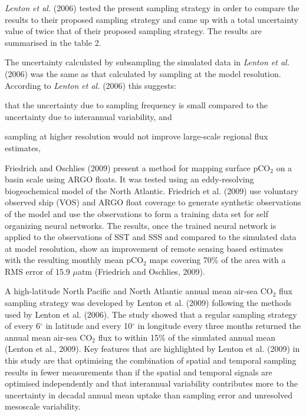 \documentclass[11pt, a4paper]{article}
\numberwithin{figure}{section}
\numberwithin{table}{section}
\begin{document}


\emph{Lenton et al.} (2006) tested the present sampling strategy in order to compare the 
results to their proposed sampling strategy and came up with a total uncertainty value of
twice that of their proposed sampling strategy. The results are summarised in the table 2.



The uncertainty calculated by subsampling the simulated data in \emph{Lenton et al.} (2006)
was the same as that calculated by sampling at the model resolution. According to
\emph{Lenton et al.} (2006) this suggests: 
\begin{inparaenum}[(1)]
\item that the uncertainty due to sampling frequency is small compared to 
the uncertainty due to interannual variability, and
\item sampling at higher resolution would not improve large-scale regional flux estimates,
\end{inparaenum}

Friedrich and Oschlies (2009) present a method for mapping surface pCO$_{2}$ 
on a basin scale using ARGO floats. It was tested using an eddy-resolving 
biogeochemical model of the North Atlantic. 
Friedrich et al. (2009) use voluntary observed ship (VOS) and ARGO float 
coverage to generate synthetic observations of the model and use the observations 
to form a training data set for self organizing neural networks.
The results, once the trained neural network is applied to the observations of 
SST and SSS and compared to the simulated data at model resolution, show an 
improvement of remote sensing based estimates with the resulting monthly mean 
pCO$_2$ maps covering 70\% of the area with a RMS error of 
15.9 $\mu$atm (Friedrich and Oschlies, 2009).

A high-latitude North Pacific and North Atlantic annual mean air-sea CO$_2$ 
flux sampling strategy was developed by Lenton et al. (2009) following the 
methods used by Lenton et al. (2006). 
The study showed that a regular sampling strategy of every 6$^\circ$ in latitude 
and every 10$^\circ$ in longitude every three months returned the annual mean 
air-sea CO$_2$ flux to within 15\% of the simulated annual mean 
(Lenton et al., 2009). 
Key features that are highlighted by Lenton et al. (2009) in this study are 
that optimising the combination of spatial and temporal sampling results
in fewer measurements than if the spatial and temporal signals are optimised 
independently and that interannual variability contributes more to the 
uncertainty in decadal annual mean uptake than sampling error and unresolved 
mesoscale variability.
\end{document}
